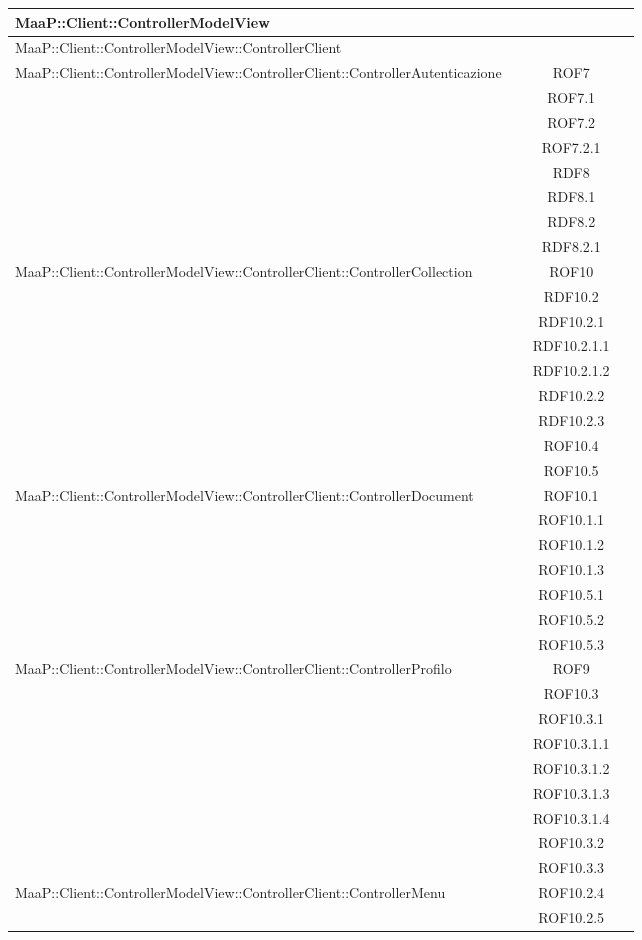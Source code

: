 \begin{center}
\begin{longtable}{|p{0.8\linewidth}|c|}
\midrule
MaaP::Client::ControllerModelView
& \\

\midrule
MaaP::Client::ControllerModelView::ControllerClient
& \\

\midrule
MaaP::Client::ControllerModelView::ControllerClient::ControllerAutenticazione
& ROF7\\
& ROF7.1\\
& ROF7.2\\
& ROF7.2.1\\
& RDF8\\
& RDF8.1\\
& RDF8.2\\
& RDF8.2.1\\

\midrule
MaaP::Client::ControllerModelView::ControllerClient::ControllerCollection
& ROF10\\
& RDF10.2\\
& RDF10.2.1\\
& RDF10.2.1.1\\
& RDF10.2.1.2\\
& RDF10.2.2\\
& RDF10.2.3\\
& ROF10.4\\
& ROF10.5\\


\midrule
MaaP::Client::ControllerModelView::ControllerClient::ControllerDocument
& ROF10.1\\
& ROF10.1.1\\
& ROF10.1.2\\
& ROF10.1.3\\
& ROF10.5.1\\
& ROF10.5.2\\
& ROF10.5.3\\


\midrule
MaaP::Client::ControllerModelView::ControllerClient::ControllerProfilo
& ROF9\\
& ROF10.3\\
& ROF10.3.1\\
& ROF10.3.1.1\\
& ROF10.3.1.2\\
& ROF10.3.1.3\\
& ROF10.3.1.4\\
& ROF10.3.2\\
& ROF10.3.3\\


\midrule
MaaP::Client::ControllerModelView::ControllerClient::ControllerMenu
& ROF10.2.4\\
& ROF10.2.5\\


\end{longtable}
\end{center}
